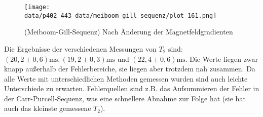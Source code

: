 \begin{figure}[h]
\centering
\texttt{[image: data/p402\_443\_data/meiboom\_gill\_sequenz/plot\_161.png]}
\caption{(Meiboom-Gill-Sequenz) Nach Änderung der Magnetfeldgradienten}
\label{fig:gill_b}
\end{figure}

Die Ergebnisse der verschiedenen Messungen von $T_2$ sind: $(20,2\pm 0,6) \si{\milli\second},  (19,2\pm 0,3) \si{\milli\second}$ und $(22,4\pm 0,6) \si{\milli\second}$. Die Werte liegen zwar knapp außerhalb der Fehlerbereiche, sie liegen aber trotzdem nah zusammen. Da alle Werte mit unterschiedlichen Methoden gemessen wurden sind auch leichte Unterschiede zu erwarten. Fehlerquellen sind z.B. das Aufsummieren der Fehler in der Carr-Purcell-Sequenz, was eine schnellere Abnahme zur Folge hat (sie hat auch das kleinste gemessene $T_2$).

